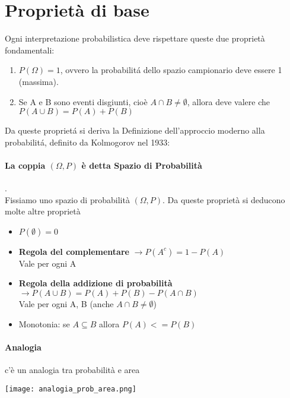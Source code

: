 \section{Proprietà di base} 
Ogni interpretazione probabilistica deve rispettare queste due proprietà fondamentali:
\begin{enumerate}
    \item $P(\Omega) = 1$, ovvero la probabilitá dello spazio campionario deve essere 1 (massima).
    \item Se A e B sono eventi disgiunti, cioè $A \cap B \neq \emptyset$, allora deve valere che $P (A \cup B) = P(A) + P(B)$
\end{enumerate}
Da queste proprietá si deriva la Definizione dell'approccio moderno alla probabilitá, definito da Kolmogorov nel 1933:

\paragraph{La coppia $(\Omega, P)$ è detta \textbf{Spazio di Probabilità}}.
\\ Fissiamo uno spazio di probabilità $(\Omega, P)$.
Da queste proprietà si deducono molte altre proprietà
\begin{itemize}
    \item $P(\emptyset) = 0$
    \item \textbf{Regola del complementare} $\to P(A^c) = 1 - P(A)$ \\ Vale per ogni A
    \item \textbf{Regola della addizione di probabilità} $\to P(A \cup B) = P(A) + P(B) - P(A \cap B)$ 
    \\ Vale per ogni A, B (anche $A \cap B \neq \emptyset$)
    \item Monotonia: se $A \subseteq B$ allora $P(A) <= P(B)$
\end{itemize}
\paragraph{Analogia} c'è un analogia tra probabilità e area
\begin{center}
    \texttt{[image: analogia\_prob\_area.png]}
\end{center}



